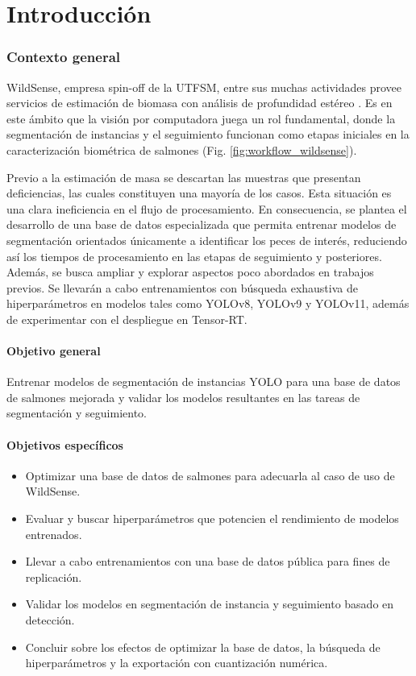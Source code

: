 \part*{Introducción}
\section{Contexto general}
WildSense, empresa spin-off de la UTFSM, entre sus muchas actividades provee servicios de estimación de biomasa con análisis de profundidad estéreo \cite{wildsense-1}. Es en este ámbito que la visión por computadora juega un rol fundamental, donde la segmentación de instancias y el seguimiento funcionan como etapas iniciales en la caracterización biométrica de salmones \cite{wildsense-2} (Fig. \ref{fig:workflow_wildsense}).

Previo a la estimación de masa se descartan las muestras que presentan deficiencias, las cuales constituyen una mayoría de los casos. Esta situación es una clara ineficiencia en el flujo de procesamiento. En consecuencia, se plantea el desarrollo de una base de datos especializada que permita entrenar modelos de segmentación orientados únicamente a identificar los peces de interés, reduciendo así los tiempos de procesamiento en las etapas de seguimiento y posteriores. Además, se busca ampliar y explorar aspectos poco abordados en trabajos previos. Se llevarán a cabo entrenamientos con búsqueda exhaustiva de hiperparámetros en modelos tales como YOLOv8, YOLOv9 y YOLOv11, además de experimentar con el despliegue en Tensor-RT.

\subsection{Objetivo general}
Entrenar modelos de segmentación de instancias YOLO para una base de datos de salmones mejorada y validar los modelos resultantes en las tareas de segmentación y seguimiento.

\subsection{Objetivos específicos}
\begin{itemize}
    \item Optimizar una base de datos de salmones para adecuarla al caso de uso de WildSense.
    \item Evaluar y buscar hiperparámetros que potencien el rendimiento de modelos entrenados.
    \item Llevar a cabo entrenamientos con una base de datos pública para fines de replicación.
    \item Validar los modelos en segmentación de instancia y seguimiento basado en detección.
    \item Concluir sobre los efectos de optimizar la base de datos, la búsqueda de hiperparámetros y la exportación con cuantización numérica.
\end{itemize}